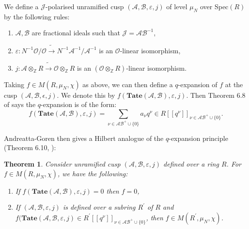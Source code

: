 \documentclass[a4paper,oneside]{amsart}
\theoremstyle{plain}
\newtheorem{thm}{Theorem}[section]
\theoremstyle{definition}
\begin{document}
We define a $\mathcal{J}$-polarised unramified cusp $(\mathcal{A}, \mathcal{B}, \varepsilon, j)$ of level $\mu_N$ over Spec$(R)$ by the following rules:
\begin{enumerate}
    \item $\mathcal{A}, \mathcal{B}$ are fractional ideals such that $\mathcal{J}=\mathcal{AB}^{-1}$,
    \item $\varepsilon: N^{-1}\mathcal{O}/\mathcal{O} \tilde{\rightarrow} N^{-1}\mathcal{A}^{-1}/ \mathcal{A}^{-1}$ is an $\mathcal{O}$-linear isomorphism,
    \item $j: \mathcal{A} \otimes_{\mathbb{Z}} R \tilde{\rightarrow} \mathcal{O} \otimes_{\mathbb{Z}} R$ is an $(\mathcal{O} \otimes_{\mathbb{Z}} R)$-linear isomorphism.
\end{enumerate}
Taking $f \in M(R, \mu_N, \chi)$ as above, we can then define a $q$-expansion of $f$ at the cusp $(\mathcal{A}, \mathcal{B}, \epsilon, j)$. We denote this by $f(\textbf{Tate}(\mathcal{A}, \mathcal{B}), \varepsilon, j)$. Then Theorem 6.8 of \cite{andreattagoren} says the $q$-expansion is of the form:
\begin{equation*}
    f(\textbf{Tate}(\mathcal{A}, \mathcal{B}), \varepsilon, j) = \sum_{\nu \in \mathcal{AB}^+\cup \{0\}} a_\nu q^\nu \in R[[q^\nu]]_{\nu \in \mathcal{AB}^+\cup \{0\}}.
\end{equation*}

Andreatta-Goren then gives a Hilbert analogue of the $q$-expansion principle (Theorem 6.10, \cite{andreattagoren}):
\begin{thm}
Consider unramified cusp $(\mathcal{A}, \mathcal{B}, \varepsilon, j)$ defined over a ring $R$. For $f \in M(R, \mu_N, \chi)$, we have the following:
\begin{enumerate}
    \item If $f(\textbf{Tate}(\mathcal{A}, \mathcal{B}), \varepsilon, j)=0$ then $f=0$,
    \item If $(\mathcal{A}, \mathcal{B}, \varepsilon, j)$ is defined over a subring $R^\prime$ of $R$ and $f(\textbf{Tate}(\mathcal{A}, \mathcal{B}, \varepsilon, j) \in R^\prime[[q^\nu]]_{\nu \in \mathcal{AB}^+\cup \{0\}}$, then $f \in M(R^\prime, \mu_N, \chi)$.
\end{enumerate}
\end{thm}
\end{document}
